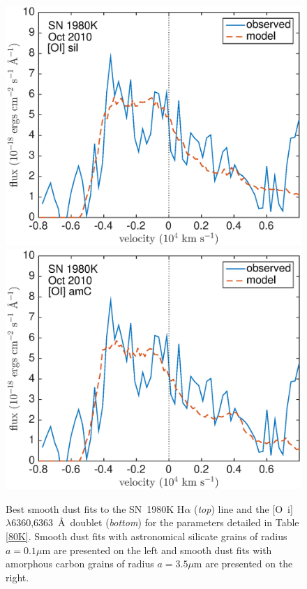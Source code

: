 {\begin{figure}[!t]
\includegraphics[scale=0.4,clip=true, trim=20 0 40 20]{chapters/chapter6/figs/80K/smooth/OI}
\includegraphics[scale=0.4,clip=true, trim=20 0 40 20]{chapters/chapter6/figs/80K/smooth/OI_amC}
\caption{Best smooth dust fits to the SN~1980K H$\alpha$ ({\em top}) line and the  [O~{\sc i}]~$\lambda$6360,6363~\AA\ doublet ({\em bottom}) for the parameters detailed in Table \ref{80K}.  Smooth dust fits with astronomical silicate grains of radius $a=0.1 \mu$m are presented on the left and smooth dust fits with amorphous carbon grains of radius $a=3.5 \mu$m are presented on the right.}
\label{80K_smooth}
\end{figure}
}


